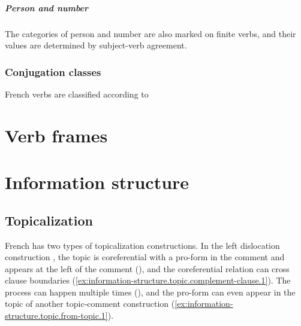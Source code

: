 \documentclass[a4paper, oneside, 12pt]{report}
\newcommand*{\citepages}[1]{pp.~{#1}}
\begin{document}
\paragraph*{Person and number}
The categories of person and number are also marked on finite verbs,
and their values are determined by subject-verb agreement. 

\subsection{Conjugation classes}

French verbs are classified according to 

\chapter{Verb frames}



\chapter{Information structure}

\section{Topicalization}\label{sec:information-structure.topic}

French has two types of topicalization constructions.
In the left dislocation construction \citep[\citepages{174-175}]{rowlett2007syntax},
the topic is coreferential with a pro-form in the comment
and appears at the left of the comment
(),
and the coreferential relation can cross clause boundaries
(\ref{ex:information-structure.topic.complement-clause.1}).
The process can happen multiple times
(),
and the pro-form can even appear in the topic of another topic-comment construction
(\ref{ex:information-structure.topic.from-topic.1}).
\end{document}
